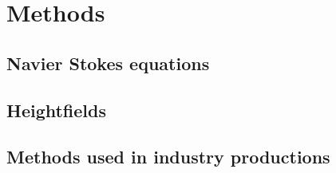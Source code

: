 \section{Methods}
\subsection{Navier Stokes equations}
\subsection{Heightfields}
\subsection{Methods used in industry productions}
